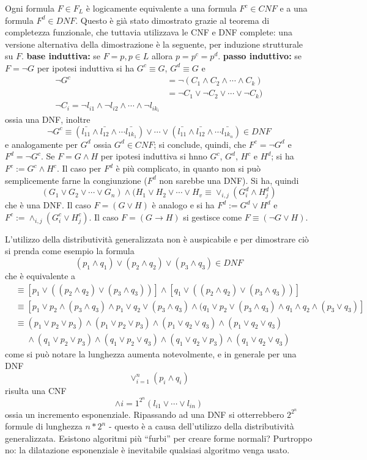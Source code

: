 Ogni formula $F \in F_L$ è logicamente equivalente a una formula $F^c \in CNF$ 
e a una formula $F^d \in DNF$. Questo è già stato dimostrato grazie al teorema 
di completezza funzionale, che tuttavia utilizzava le CNF e DNF complete: una 
versione alternativa della dimostrazione è la seguente, per induzione strutturale 
su $F$. 
\textbf{base induttiva:} se $F = p, p \in L$ allora $p = p^c = p^d$. 
\textbf{passo induttivo:} 
se $F = \neg G$ per ipotesi induttiva si ha $G^c \equiv G$, $G^d \equiv G$ 
e 
\begin{align*}
\neg G^c &= \neg(C_1 \land C_2 \land \cdots \land C_k) \\
       &= \neg C_1 \lor \neg C_2 \lor \cdots \lor \neg C_k) \\
\neg C_i = \neg l_{i1} \land \neg l_{i2} \land \cdots \land \neg l_{ik_i}
\end{align*}
ossia una DNF, inoltre 
$$
\neg G^c \equiv (\bar{l_{11}} \land \bar{l_{12}} \land \cdots \bar{l_{1k_1}}) \lor \cdots \lor (\bar{l_{11}} \land \bar{l_{12}} \land \cdots \bar{l_{1k_n}}) \in DNF
$$
e analogamente per $G^d$ ossia $G^d \in CNF$; si conclude, quindi, che 
$F^c = \neg G^d$ e $F^d = \neg G^c$. 
Se $F = G \land H$ per ipotesi induttiva si hnno $G^c$, $G^d$, $H^c$ e $H^d$; si 
ha $F^c := G^c \land H^c$. Il caso per $F^d$ è più complicato, in quanto 
non si può semplicemente farne la congiunzione ($F^d$ non sarebbe una DNF). 
Si ha, quindi 
$$
(G_1 \lor G_2 \lor \cdots \lor G_n) \land (H_1 \lor H_2 \lor \cdots \lor H_v \equiv \lor_{i,j} (G^d_i \land H^d_j)
$$
che è una DNF. 
Il caso $F=(G \lor H)$ è analogo e si ha $F^d := G^d \lor H^d$ e 
$F^c := \land_{i,j} (G^c_i \lor H^c_j)$.
Il caso $F = (G \rightarrow H)$ si gestisce come $F \equiv (\neg G \lor H)$. 

L'utilizzo della distributività generalizzata non è auspicabile e per dimostrare 
ciò si prenda come esempio la formula 
$$
(p_1 \land q_1) \lor (p_2 \land q_2) \lor (p_3 \land q_3) \in DNF
$$
che è equivalente a 
\begin{align*}
  &\equiv   [p_1 \lor ((p_2 \land q_2) \lor (p_3 \land q_3))] \land [q_1 \lor ((p_2 \land q_2) \lor (p_3 \land q_3))] \\
  & \equiv [p_1 \lor p_2 \land (p_3 \land q_3) \land p_1 \lor q_2 \lor (p_3 \land q_3) \land (q_1 \lor p_2 \lor (p_3 \land q_3) \land q_1 \land q_2 \land (p_3 \lor q_3)] \\
  &\equiv (p_1 \lor p_2 \lor p_3) \land (p_1 \lor p_2 \lor p_3) \land (p_1 \lor q_2 \lor q_3) \land (p_1 \lor q_2 \lor q_3)  \\
  & ~~~~~~ \land (q_1 \lor p_2 \lor p_3) \land (q_1 \lor p_2 \lor q_3) \land (q_1 \lor q_2 \lor p_3) \land (q_1 \lor q_2 \lor q_3)
\end{align*}
come si può notare la lunghezza aumenta notevolmente, e in generale per una DNF
$$
\lor_{i = 1}^{n} (p_i \land q_i)
$$
risulta una CNF 
$$
\land{i = 1}^{2^n}(l_{i1} \lor \cdots \lor l_{in})
$$
ossia un incremento esponenziale. Ripassando ad una DNF si otterrebbero $2^{2^{n}}$ 
formule di lunghezza $n*2^n$ - questo è a causa dell'utilizzo della distributività 
generalizzata. 
Esistono algoritmi più ``furbi'' per creare forme normali? Purtroppo no: la dilatazione 
esponenziale è inevitabile qualsiasi algoritmo venga usato. 

